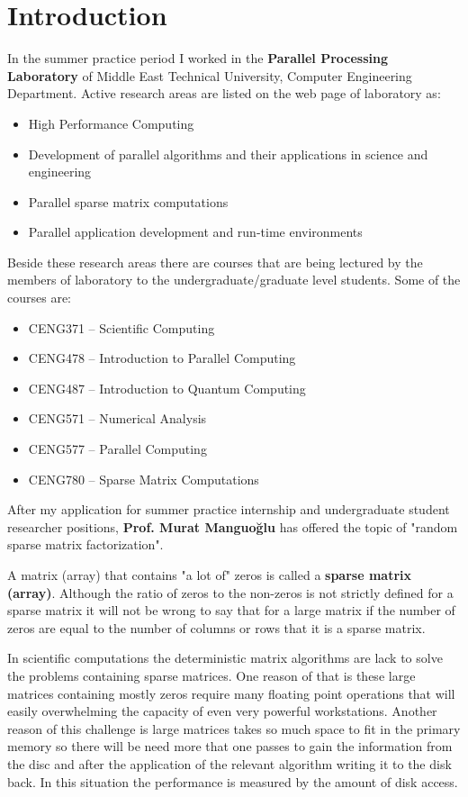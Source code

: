 \documentclass[11pt,a4paper]{article}
\theoremstyle{definition}
\begin{document}
	\section{Introduction}
		In the summer practice period I worked in the \textbf{Parallel Processing Laboratory} of Middle East Technical University, Computer Engineering Department. Active research areas are listed on the web page of laboratory as:
		\begin{itemize}
			\item High Performance Computing
			\item Development of parallel algorithms and their applications in science and engineering
			\item Parallel sparse matrix computations
			\item Parallel application development and run-time environments
		\end{itemize}
		Beside these research areas there are courses that are being lectured by the members of laboratory to the undergraduate/graduate level students. Some of the courses are:
		\begin{itemize}
			\item CENG371 – Scientific Computing
			\item CENG478 – Introduction to Parallel Computing
			\item CENG487 – Introduction to Quantum Computing
			\item CENG571 – Numerical Analysis
			\item CENG577 – Parallel Computing
			\item CENG780 – Sparse Matrix Computations
		\end{itemize}
		
		After my application for summer practice internship and undergraduate student researcher positions, \textbf{Prof. Murat Manguoğlu} has offered the topic of "random sparse matrix factorization".
		
		A matrix (array) that contains "a lot of" zeros is called a \textbf{sparse matrix (array)}. Although the ratio of zeros to the non-zeros is not strictly defined for a sparse matrix it will not be wrong to say that for a large matrix if the number of zeros are equal to the number of columns or rows that it is a sparse matrix. 
		
		In scientific computations the deterministic matrix algorithms are lack to solve the problems containing sparse matrices. One reason of that is these large matrices containing mostly zeros require many floating point operations that will easily overwhelming the capacity of even very powerful workstations.  Another reason of this challenge is large matrices takes so much space to fit in the primary memory so there will be need more that one passes to gain the information from the disc and after the application of the relevant algorithm writing it to the disk back. In this situation the performance is measured by the amount of disk access.
		
\end{document}
